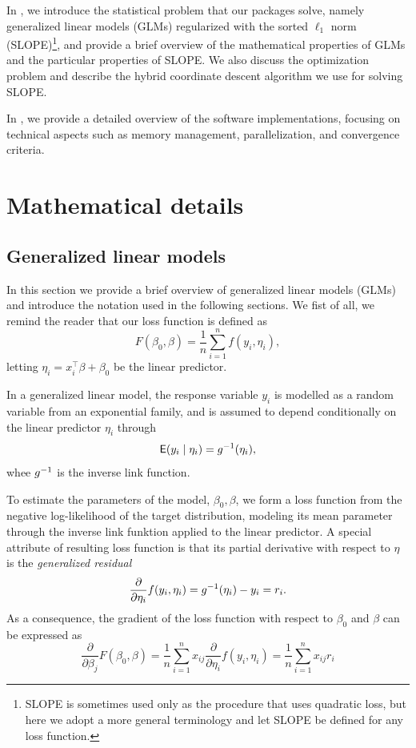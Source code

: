 \documentclass[article]{jss}
\let\Cref\crtCref
\begin{document}
In \Cref{sec:math-details}, we introduce the statistical problem that our
packages solve, namely generalized linear models (GLMs) regularized with the sorted
\(\ell_1\) norm (SLOPE)\footnote{SLOPE is sometimes used only as the procedure
  that uses quadratic loss, but here we adopt a more general terminology and
  let SLOPE be defined for any loss function.}, and provide a brief overview of
the mathematical properties of GLMs and the particular properties of SLOPE.
We also discuss the optimization problem and describe the hybrid
coordinate descent algorithm we use for solving SLOPE.

In \Cref{sec:implementation-details}, we provide a detailed overview of the
software implementations, focusing on technical aspects such as
memory management, parallelization, and convergence criteria.

\section{Mathematical details}\label{sec:math-details}

\subsection{Generalized linear models}
\label{sec:glm}

In this section we provide a brief overview of generalized linear models (GLMs)
and introduce the notation used in the following sections. We fist of all,
we remind the reader that our loss function is defined as
\[
  F(\beta_0, \beta) = \frac{1}{n} \sum_{i=1}^n f(y_i, \eta_i),
\]
letting \(\eta_i = x_i^\intercal \beta + \beta_0\) be the
linear predictor.

In a generalized linear model, the response variable \(y_i\) is modelled
as a random variable from an exponential family, and is assumed to depend
conditionally on the linear predictor \(\eta_i\) through
\[
  \mathsf{E}(y_i \mid \eta_i) = g^{-1}(\eta_i),
\]
whee \(g^{-1}\) is the inverse link function.

To estimate the parameters of the model, \(\beta_0, \beta\), we form a loss
function from the negative log-likelihood of the target distribution, modeling
its mean parameter through the inverse link funktion applied to the linear
predictor. A special attribute of resulting loss function is that its partial
derivative with respect to \(\eta\) is the
\emph{generalized residual}
\[
  \frac{\partial}{\partial \eta_i} f(y_i, \eta_i) = g^{-1}(\eta_i) - y_i = r_i.
\]
As a consequence, the gradient of the loss function with respect to \(\beta_0\)
and \(\beta\) can be expressed as
\[
  \frac{\partial}{\partial \beta_j} F(\beta_0,\beta)
  = \frac{1}{n} \sum_{i=1}^n x_{ij} \frac{\partial}{\partial \eta_i} f(y_i, \eta_i)
  = \frac{1}{n} \sum_{i=1}^n x_{ij} r_i
\]
\end{document}
